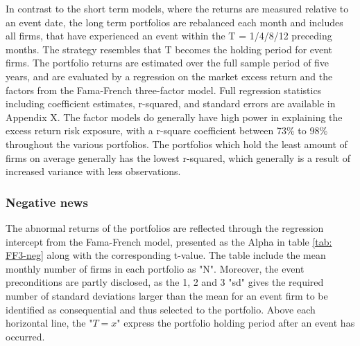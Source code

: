 In contrast to the short term models, where the returns are measured relative to an event date, the long term portfolios are rebalanced each month and includes all firms, that have experienced an event within the T = 1/4/8/12 preceding months. The strategy resembles that T becomes the holding period for event firms. The portfolio returns are estimated over the full sample period of five years, and are evaluated by a regression on the market excess return and the factors from the Fama-French \citeyear{Fama_french_3fac} three-factor model. Full regression statistics including coefficient estimates, r-squared, and standard errors are available in Appendix X. The factor models do generally have high power in explaining the excess return risk exposure, with a r-square coefficient between 73\% to 98\% throughout the various portfolios. The portfolios which hold the least amount of firms on average generally has the lowest r-squared, which generally is a result of increased variance with less observations.  


\subsubsection{Negative news}

The abnormal returns of the portfolios are reflected through the regression intercept from the Fama-French model, presented as the Alpha in table \ref{tab: FF3-neg} along with the corresponding t-value. The table include the mean monthly number of firms in each portfolio as "N". Moreover, the event preconditions are partly disclosed, as the 1, 2 and 3 "sd" gives the required number of standard deviations larger than the mean for an event firm to be identified as consequential and thus selected to the portfolio. Above each horizontal line, the "$T = x$" express the portfolio holding period after an event has occurred. 

